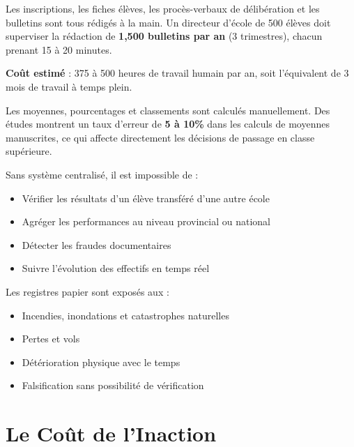 \documentclass[12pt,a4paper,oneside]{report}
\begin{document}
\begin{probleme}
Les inscriptions, les fiches élèves, les procès-verbaux de délibération et les bulletins sont tous rédigés à la main. Un directeur d'école de 500 élèves doit superviser la rédaction de \textbf{1{,}500 bulletins par an} (3 trimestres), chacun prenant 15 à 20 minutes.

\textbf{Coût estimé} : 375 à 500 heures de travail humain par an, soit l'équivalent de 3 mois de travail à temps plein.
\end{probleme}

\begin{probleme}
Les moyennes, pourcentages et classements sont calculés manuellement. Des études montrent un taux d'erreur de \textbf{5 à 10\%} dans les calculs de moyennes manuscrites, ce qui affecte directement les décisions de passage en classe supérieure.
\end{probleme}

\begin{probleme}
Sans système centralisé, il est impossible de :
\begin{itemize}
  \item Vérifier les résultats d'un élève transféré d'une autre école
  \item Agréger les performances au niveau provincial ou national
  \item Détecter les fraudes documentaires
  \item Suivre l'évolution des effectifs en temps réel
\end{itemize}
\end{probleme}

\begin{probleme}
Les registres papier sont exposés aux :
\begin{itemize}
  \item Incendies, inondations et catastrophes naturelles
  \item Pertes et vols
  \item Détérioration physique avec le temps
  \item Falsification sans possibilité de vérification
\end{itemize}
\end{probleme}

\section{Le Coût de l'Inaction}
\end{document}
